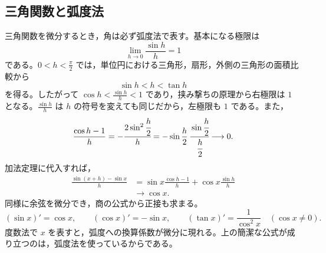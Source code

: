 \subsection{三角関数と弧度法}
三角関数を微分するとき，角は必ず弧度法で表す。基本になる極限は
\[
 \lim_{h\to0}\frac{\sin h}{h}=1
\]
である。$0<h<\frac\pi2$ では，単位円における三角形，扇形，外側の三角形の面積比較から
\[
 \sin h<h<\tan h
\]
を得る。したがって $\cos h<\frac{\sin h}{h}<1$ であり，挟み撃ちの原理から右極限は $1$ となる。$\frac{\sin h}{h}$ は $h$ の符号を変えても同じだから，左極限も $1$ である。また，
\[
 \frac{\cos h-1}{h}
 =-\cfrac{2\sin^2\cfrac h2}{h}
 =-\sin\frac h2\,\cfrac{\sin\cfrac h2}{\cfrac h2}
 \longrightarrow0.
\]
加法定理に代入すれば，
\begin{align*}
 \frac{\sin(x+h)-\sin x}{h}
 &=\sin x\frac{\cos h-1}{h}
   +\cos x\frac{\sin h}{h}\\
 &\longrightarrow\cos x.
\end{align*}
同様に余弦を微分でき，商の公式から正接も求まる。
\[
 (\sin x)'=\cos x,\qquad
 (\cos x)'=-\sin x,\qquad
 (\tan x)'=\frac1{\cos^2x}\quad(\cos x\ne0).
\]
度数法で $x$ を表すと，弧度への換算係数が微分に現れる。上の簡潔な公式が成り立つのは，弧度法を使っているからである。

